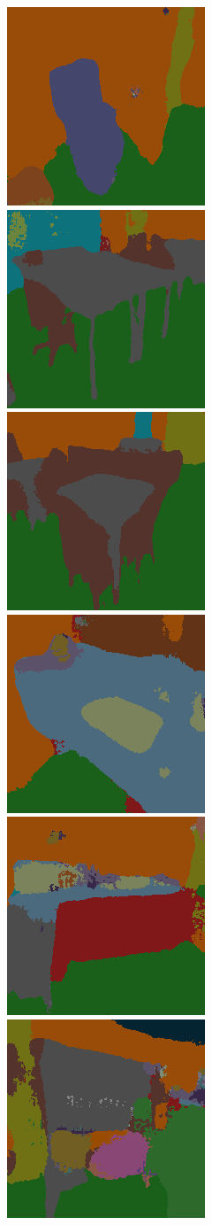 \begin{figure}[p]
\begin{center}
{\includegraphics[height=0.125\linewidth]{BayesianSegNet/segnet_bayes_00414_segmentation.png}
\includegraphics[height=0.125\linewidth]{BayesianSegNet/segnet_bayes_00375_segmentation.png}
\includegraphics[height=0.125\linewidth]{BayesianSegNet/segnet_bayes_00461_segmentation.png}
\includegraphics[height=0.125\linewidth]{BayesianSegNet/segnet_bayes_00116_segmentation.png}
\includegraphics[height=0.125\linewidth]{BayesianSegNet/segnet_bayes_01035_segmentation.png}
\includegraphics[height=0.125\linewidth]{BayesianSegNet/segnet_bayes_00856_segmentation.png}
}
\end{center}
\end{figure}
